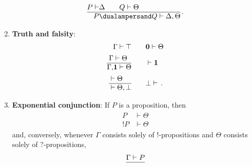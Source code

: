 \begin{enumerate}
            \begin{gather}
                \begin{aligned}
                    P\vdash&\Delta\qquad Q\vdash\Theta\\
                    \hline
                    P&\dualampersand Q\vdash\Delta,\Theta
                \end{aligned}\,.
            \end{gather}
        \item\textbf{Truth and falsity}:
            \begin{gather}
                \begin{aligned}
                    \Gamma\vdash\top &\qquad \mathbf{0}\vdash\Theta\\
                    \begin{aligned}
                        \Gamma&\vdash\Theta\\
                        \hline
                        \Gamma,&\mathbf{1}\vdash\Theta
                    \end{aligned}
                    &\qquad \vdash\mathbf{1}
                    \\
                    \begin{aligned}
                        &\vdash\Theta\\
                        \hline
                        &\vdash\Theta,\bot
                    \end{aligned}
                    &\qquad \bot\vdash\,.
                \end{aligned}
            \end{gather}
        \item\textbf{Exponential conjunction}: If $P$ is a proposition, then
            \begin{gather}
                \begin{aligned}
                    P&\vdash\Theta\\
                    \hline
                    !P&\vdash\Theta
                \end{aligned}
            \end{gather}
            and, conversely, whenever $\Gamma$ consists solely of $!$-propositions and $\Theta$ consists solely of $?$-propositions,
            \begin{gather}
                \begin{aligned}
                    \Gamma&\vdash P\\
                    \hline

\end{aligned}
\end{gather}
\end{enumerate}
